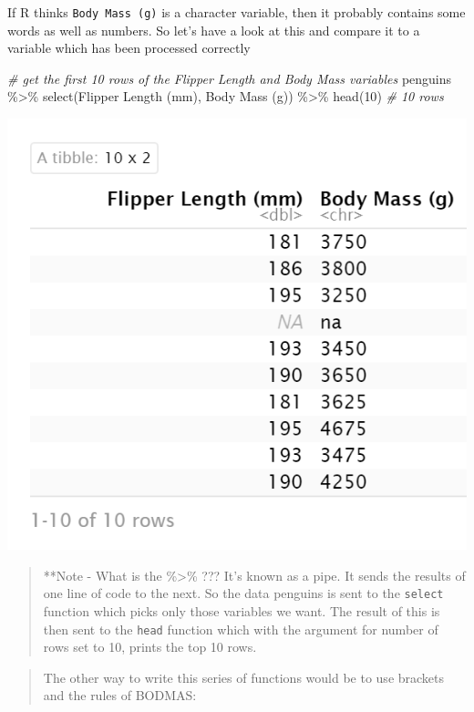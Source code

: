 \documentclass[
]{book}
\newenvironment{Shaded}{\begin{snugshade}}{\end{snugshade}}
\newcommand{\AttributeTok}[1]{\textcolor[rgb]{0.77,0.63,0.00}{#1}}
\newcommand{\CommentTok}[1]{\textcolor[rgb]{0.56,0.35,0.01}{\textit{#1}}}
\newcommand{\DecValTok}[1]{\textcolor[rgb]{0.00,0.00,0.81}{#1}}
\newcommand{\FunctionTok}[1]{\textcolor[rgb]{0.00,0.00,0.00}{#1}}
\newcommand{\NormalTok}[1]{#1}
\newcommand{\SpecialCharTok}[1]{\textcolor[rgb]{0.00,0.00,0.00}{#1}}
\newcommand{\StringTok}[1]{\textcolor[rgb]{0.31,0.60,0.02}{#1}}
\begin{document}
If R thinks \texttt{Body\ Mass\ (g)} is a character variable, then it probably contains some words as well as numbers. So let's have a look at this and compare it to a variable which has been processed correctly

\begin{Shaded}
\begin{Highlighting}[]
\CommentTok{\# get the first 10 rows of the Flipper Length and Body Mass variables}
\NormalTok{penguins }\SpecialCharTok{\%\textgreater{}\%} 
  \FunctionTok{select}\NormalTok{(}\StringTok{\textasciigrave{}}\AttributeTok{Flipper Length (mm)}\StringTok{\textasciigrave{}}\NormalTok{, }
         \StringTok{\textasciigrave{}}\AttributeTok{Body Mass (g)}\StringTok{\textasciigrave{}}\NormalTok{) }\SpecialCharTok{\%\textgreater{}\%} 
  \FunctionTok{head}\NormalTok{(}\DecValTok{10}\NormalTok{) }\CommentTok{\# 10 rows}
\end{Highlighting}
\end{Shaded}

\includegraphics[width=0.8\linewidth]{images/NA}

\begin{quote}
**Note - What is the \%\textgreater\% ??? It's known as a pipe. It sends the results of one line of code to the next. So the data penguins is sent to the \texttt{select} function which picks only those variables we want. The result of this is then sent to the \texttt{head} function which with the argument for number of rows set to 10, prints the top 10 rows.
\end{quote}

\begin{quote}
The other way to write this series of functions would be to use brackets and the rules of BODMAS:
\end{quote}
\end{document}
